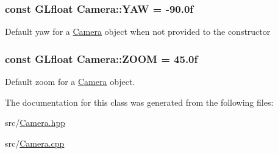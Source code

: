\subsubsection[{\texorpdfstring{Y\+AW}{YAW}}]{\setlength{\rightskip}{0pt plus 5cm}const G\+Lfloat Camera\+::\+Y\+AW = -\/90.\+0f\hspace{0.3cm}{\ttfamily [static]}}\hypertarget{classCamera_a79050e94e98c5c1cc0127c41edb4ed16}{}\label{classCamera_a79050e94e98c5c1cc0127c41edb4ed16}
Default yaw for a \hyperlink{classCamera}{Camera} object when not provided to the constructor 
\subsubsection[{\texorpdfstring{Z\+O\+OM}{ZOOM}}]{\setlength{\rightskip}{0pt plus 5cm}const G\+Lfloat Camera\+::\+Z\+O\+OM = 45.\+0f\hspace{0.3cm}{\ttfamily [static]}}\hypertarget{classCamera_a34cdfe4c17868880037d5ff78159f158}{}\label{classCamera_a34cdfe4c17868880037d5ff78159f158}
Default zoom for a \hyperlink{classCamera}{Camera} object. 

The documentation for this class was generated from the following files\+:\begin{DoxyCompactItemize}
\item 
src/\hyperlink{Camera_8hpp}{Camera.\+hpp}\item 
src/\hyperlink{Camera_8cpp}{Camera.\+cpp}\end{DoxyCompactItemize}
